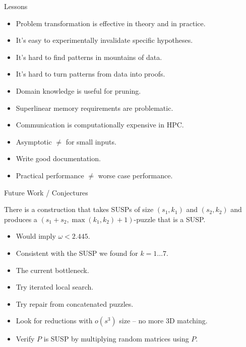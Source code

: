 \documentclass[t,10pt,
mathserif,xcolor=dvipsnames]{beamer}
\begin{document}
\begin{myframe}{Lessons}

  \begin{itemize}
  \item Problem transformation is effective in theory and in practice.
  \item It's easy to experimentally invalidate specific hypotheses.
  \item It's hard to find patterns in mountains of data.  
  \item It's hard to turn patterns from data into proofs.
  \item Domain knowledge is useful for pruning.
  \item Superlinear memory requirements are problematic.
  \item Communication is computationally expensive in HPC.
  \item Asymptotic $\neq$ for small inputs.
  \item Write good documentation.
  \item Practical performance $\neq$ worse case performance.
  \end{itemize}
  
\end{myframe}

\begin{myframe}{Future Work / Conjectures}

  \begin{conj}
    There is a construction that takes SUSPs of size $(s_1,k_1)$ and
    $(s_2,k_2)$ and produces a $(s_1+s_2,\max(k_1,k_2)+1)$-puzzle that
    is a SUSP.
  \end{conj}
  \begin{itemize}
  \item Would imply $\omega < 2.445$.
  \item Consistent with the SUSP we found for $k = 1\ldots 7$.
  \end{itemize}

  \begin{itemize}
  \item The current bottleneck.
  \item Try iterated local search.
  \item Try repair from concatenated puzzles.
  \end{itemize}


  \begin{itemize}
  \item Look for reductions with $o(s^3)$ size -- no more 3D matching.
  \item Verify $P$ is SUSP by multiplying random matrices using $P$.
  \end{itemize}
  
  
\end{myframe}
\end{document}
